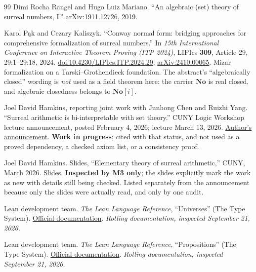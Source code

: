 \documentclass[11pt,letterpaper]{article}
\numberwithin{equation}{section}
\theoremstyle{definition}
\theoremstyle{remark}
\newcommand{\No}{\mathbf{No}}
\begin{document}
\begin{thebibliography}{99}
Dimi Rocha Rangel and Hugo Luiz Mariano. ``An algebraic (set) theory of surreal
numbers, I.'' \href{https://arxiv.org/abs/1911.12726}{arXiv:1911.12726}, 2019.

Karol P\k{a}k and Cezary Kaliszyk. ``Conway normal form: bridging approaches for
comprehensive formalization of surreal numbers.'' In \emph{15th International
Conference on Interactive Theorem Proving (ITP 2024)}, LIPIcs \textbf{309},
Article 29, 29:1--29:18, 2024.
\href{https://doi.org/10.4230/LIPIcs.ITP.2024.29}{doi:10.4230/LIPIcs.ITP.2024.29};
\href{https://arxiv.org/abs/2410.00065}{arXiv:2410.00065}. Mizar formalization
on a Tarski--Grothendieck foundation. The abstract's ``algebraically closed''
wording is \emph{not} used as a field theorem here: the carrier $\No$ is real
closed, and algebraic closedness belongs to $\No[i]$.

Joel David Hamkins, reporting joint work with Junhong Chen and Ruizhi Yang.
``Surreal arithmetic is bi-interpretable with set theory.'' CUNY Logic Workshop
lecture announcement, posted February 4, 2026; lecture March 13, 2026.
\href{https://jdh.hamkins.org/surreal-arithmetic-cuny-logic-workshop-march-2026/}{Author's announcement}.
\textbf{Work in progress}; cited with that status, and not used as a proved
dependency, a checked axiom list, or a consistency proof.

Joel David Hamkins. Slides, ``Elementary theory of surreal arithmetic,'' CUNY,
March 2026.
\href{https://jdh.hamkins.org/wp-content/uploads/Slides-Elementary-theory-of-surreal-arithmetic-Hamkins-CUNY-March-2026.pdf}{Slides}.
\textbf{Inspected by M3 only}; the slides explicitly mark the work as new with
details still being checked. Listed separately from the announcement because
only the slides were actually read, and only by one audit.

Lean development team. \emph{The Lean Language Reference}, ``Universes'' (The
Type System).
\href{https://lean-lang.org/doc/reference/latest/The-Type-System/Universes/}{Official documentation}.
\emph{Rolling documentation, inspected September 21, 2026.}

Lean development team. \emph{The Lean Language Reference}, ``Propositions'' (The
Type System).
\href{https://lean-lang.org/doc/reference/latest/The-Type-System/Propositions/}{Official documentation}.
\emph{Rolling documentation, inspected September 21, 2026.}


\end{thebibliography}
\end{document}
